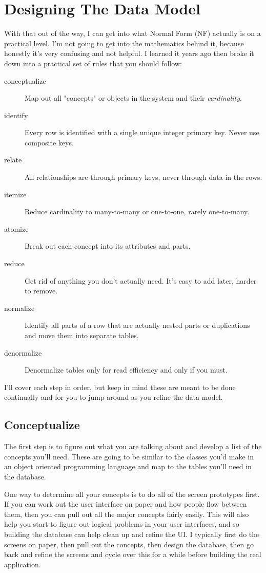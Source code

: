 \section{Designing The Data Model}

With that out of the way, I can get into what Normal Form (NF) actually is on a practical
level.  I'm not going to get into the mathematics behind it, because honestly it's very
confusing and not helpful.  I learned it years ago then broke it down into a practical
set of rules that you should follow:

\begin{description}
\item[conceptualize] Map out all "concepts" or objects in the system and their \emph{cardinality}.
\item[identify] Every row is identified with a single unique integer primary key.  Never use composite keys.
\item[relate] All relationships are through primary keys, never through data in the rows.
\item[itemize] Reduce cardinality to many-to-many or one-to-one, rarely one-to-many.
\item[atomize] Break out each concept into its attributes and parts.
\item[reduce] Get rid of anything you don't actually need.  It's easy to add later, harder to remove.
\item[normalize] Identify all parts of a row that are actually nested parts or duplications and move them into separate tables.
\item[denormalize] Denormalize tables only for read efficiency and only if you must.
\end{description}

I'll cover each step in order, but keep in mind these are meant to be done continually and for you
to jump around as you refine the data model.

\subsection{Conceptualize}

The first step is to figure out what you are talking about and develop a list of the concepts you'll
need.  These are going to be similar to the classes you'd make in an object oriented programming
language and map to the tables you'll need in the database.

One way to determine all your concepts is to do all of the screen prototypes first.  If you can
work out the user interface on paper and how people flow between them, then you can pull out
all the major concepts fairly easily.  This will also help you start to figure out logical 
problems in your user interfaces, and so building the database can help clean up and refine
the UI.  I typically first do the screens on paper, then pull out the concepts, then design
the database, then go back and refine the screens and cycle over this for a while before
building the real application.

